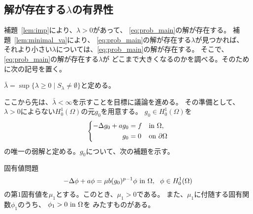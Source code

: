 \subsection{解が存在する$\lambda$の有界性}

補題~\ref{lem:imp}により、$\lambda > 0$があって、
\ref{eq:prob_main}の解が存在する。
補題~\ref{lem:minimal_va}により、
\ref{eq:prob_main}の解が存在する$\lambda$が見つかれば、
それより小さい$\lambda$については、\ref{eq:prob_main}の解が存在する。
そこで、\ref{eq:prob_main}の解が存在する$\lambda$が
どこまで大きくなるのかを調べる。そのために次の記号を置く。

\begin{nota}
 $\bar{\lambda} = \sup \{ \lambda \geq 0 \mid S_\lambda \neq \emptyset
 \}$と定める。
\end{nota}

ここから先は、$\bar{\lambda} < \infty$を示すことを目標に議論を進める。
その準備として、$\lambda > 0$によらない$H_0^1(\Omega)$の元$g_0$を用意する。
$g_0 \in H_0^1(\Omega)$を
\begin{align}
 \left\{
 \begin{aligned}
    -\Delta g_0 + a g_0 
  &= f  & &\text{in}~ \Omega,  \\
  g_0 &= 0 & &\text{on}~ \partial\Omega
 \end{aligned}
 \right. \label{eq:g_0}
\end{align}
の唯一の弱解と定める。$g_0$について、次の補題を示す。

\begin{lem} \label{lem:g_0}
 固有値問題
 \[
  -\Delta \phi + a \phi = \mu b (g_0)^{p-1}\phi ~\text{in}~ \Omega, \ \
 \phi \in H_0^1(\Omega)
 \]
 の第$1$固有値を$\mu_1$とする。このとき、$\mu_1 > 0$である。
 また、$\mu_1$に付随する固有関数$\phi_1$のうち、
 $\phi_1 > 0 ~\text{in}~ \Omega$を
 みたすものがある。
\end{lem}

